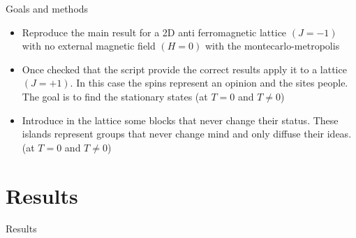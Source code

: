 \documentclass{beamer}
\begin{document}
\begin{frame}{Goals and methods}
\begin{itemize}
\item Reproduce the main result for a 2D anti ferromagnetic lattice $(J=-1)$ with no external magnetic field $(H=0)$ with the montecarlo-metropolis
\item  Once checked that the script provide the correct results apply it to a lattice $(J=+1)$.  In this case the spins represent an opinion and the sites people.  The goal is to find the stationary states (at $T=0$ and $T\neq0$)
\item Introduce in the lattice some blocks that never change their status.  These islands represent groups that never change mind and only diffuse their ideas.  (at $T=0$ and $T\neq0$)
\end{itemize}
\end{frame}

\section{Results}

\begin{frame}
\begin{center}
{\Huge Results}
\end{center}
\end{frame}
\end{document}
